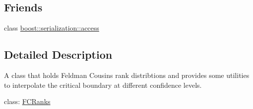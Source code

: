 \subsection*{Friends}
\begin{DoxyCompactItemize}
\item 
class \hyperlink{classFCRanks_ac98d07dd8f7b70e16ccb9a01abf56b9c}{boost\-::serialization\-::access}
\end{DoxyCompactItemize}


\subsection{Detailed Description}
A class that holds Feldman Cousins rank distribtions and provides some utilities to interpolate the critical boundary at different confidence levels. 

class\-: \hyperlink{classFCRanks}{F\-C\-Ranks} 

